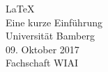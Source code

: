 \begin{center}
\Huge \LaTeX\\
\vspace{5mm} \LARGE Eine kurze Einführung\\
\vspace{12mm} \Large  Universität Bamberg\\[5mm]
\large 09. Oktober 2017\\ 
Fachschaft WIAI\normalsize \\
\end{center}
